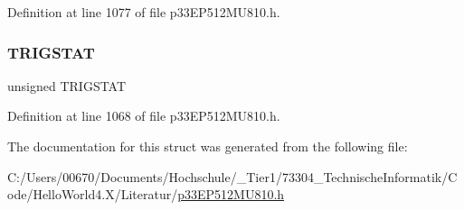 Definition at line 1077 of file p33\+E\+P512\+M\+U810.\+h.

\mbox{\label{structtag_i_c10_c_o_n2_b_i_t_s_ab379549de54ac93ad4aa73686c34cb7c}} 
\subsubsection{\texorpdfstring{T\+R\+I\+G\+S\+T\+AT}{TRIGSTAT}}
{\footnotesize\ttfamily unsigned T\+R\+I\+G\+S\+T\+AT}



Definition at line 1068 of file p33\+E\+P512\+M\+U810.\+h.



The documentation for this struct was generated from the following file\+:\begin{DoxyCompactItemize}
\item 
C\+:/\+Users/00670/\+Documents/\+Hochschule/\+\_\+\+Tier1/73304\+\_\+\+Technische\+Informatik/\+Code/\+Hello\+World4.\+X/\+Literatur/\hyperlink{p33_e_p512_m_u810_8h}{p33\+E\+P512\+M\+U810.\+h}\end{DoxyCompactItemize}

